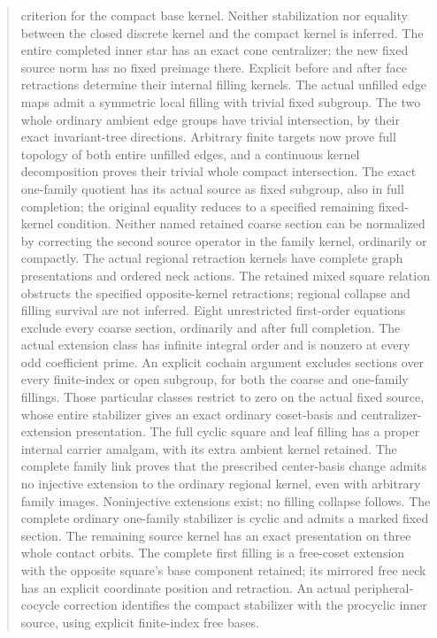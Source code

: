 \documentclass[11pt,a4paper]{article}
\begin{document}
\begin{abstract}
criterion for the compact base kernel. Neither stabilization nor equality
between the closed discrete kernel and the compact kernel is inferred.
The entire completed inner star has an exact cone centralizer;
the new fixed source norm has no fixed preimage there. Explicit before
and after face retractions determine their internal filling kernels.
The actual unfilled edge maps admit a symmetric local filling with
trivial fixed subgroup. The two whole ordinary ambient edge groups have
trivial intersection, by their exact invariant-tree directions.
Arbitrary finite targets now prove full topology of both entire
unfilled edges, and a continuous kernel decomposition proves their
trivial whole compact intersection. The exact one-family quotient has
its actual source as fixed subgroup, also in full completion; the
original equality reduces to a specified remaining fixed-kernel
condition. Neither named retained coarse section can be normalized by
correcting the second source operator in the family kernel, ordinarily
or compactly. The actual regional retraction kernels have complete
graph presentations and ordered neck actions. The retained mixed square
relation obstructs the specified opposite-kernel retractions; regional
collapse and filling survival are not inferred. Eight unrestricted first-order
equations exclude every coarse section, ordinarily and after full
completion. The actual extension class has infinite integral order and
is nonzero at every odd coefficient prime. An explicit cochain argument
excludes sections over every finite-index or open subgroup, for both
the coarse and one-family fillings. Those particular classes restrict
to zero on the actual fixed source, whose entire stabilizer gives an
exact ordinary coset-basis and centralizer-extension presentation.
The full cyclic square and leaf filling has a proper internal carrier
amalgam, with its extra ambient kernel retained. The complete family
link proves that the prescribed center-basis change admits no injective
extension to the ordinary regional kernel, even with arbitrary family
images. Noninjective extensions exist; no filling collapse follows. The complete ordinary
one-family stabilizer is cyclic and admits a marked fixed section.
The remaining source kernel has an exact presentation on three whole
contact orbits. The complete first filling is a free-coset extension
with the opposite square's base component retained; its mirrored free
neck has an explicit coordinate position and retraction. An actual
peripheral-cocycle correction identifies the compact stabilizer with
the procyclic inner source, using explicit finite-index free bases.

\end{abstract}
\end{document}

